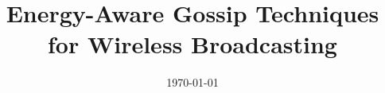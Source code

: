 \documentclass[letterpaper, 11pt, oneside]{Thesis}  %
\begin{document}
\frontmatter      %

\title  {Energy-Aware Gossip Techniques for Wireless Broadcasting}
\addresses  {\groupname\\\deptname\\\univname}  %
\date       {\today}
\subject    {}
\keywords   {}

\maketitle


\fancyhead{}  %
\rhead{\thepage}  %
\lhead{}  %

\pagestyle{fancy}  %
\end{document}
